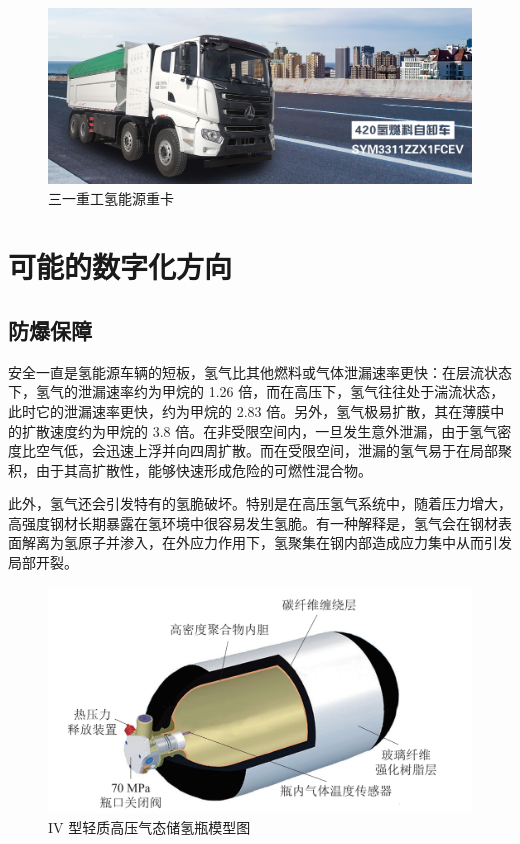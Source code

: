\documentclass[UTF8,a4paper,11pt]{article}
\begin{document}
\begin{figure}[htbp]
\centering
\includegraphics[scale=0.3]{p7.png}
\caption{三一重工氢能源重卡}
\end{figure}

\section{可能的数字化方向}
\subsection{防爆保障}
安全一直是氢能源车辆的短板，氢气比其他燃料或气体泄漏速率更快：在层流状态下，氢气的泄漏速率约为甲烷的 1.26 倍，而在高压下，氢气往往处于湍流状态，此时它的泄漏速率更快，约为甲烷的 2.83 倍。另外，氢气极易扩散，其在薄膜中的扩散速度约为甲烷的 3.8 倍。在非受限空间内，一旦发生意外泄漏，由于氢气密度比空气低，会迅速上浮并向四周扩散。而在受限空间，泄漏的氢气易于在局部聚积，由于其高扩散性，能够快速形成危险的可燃性混合物。

此外，氢气还会引发特有的氢脆破坏。特别是在高压氢气系统中，随着压力增大，高强度钢材长期暴露在氢环境中很容易发生氢脆。有一种解释是，氢气会在钢材表面解离为氢原子并渗入，在外应力作用下，氢聚集在钢内部造成应力集中从而引发局部开裂。

\begin{figure}[htbp]
\centering
\includegraphics[scale=0.45]{p8.png}
\caption{IV 型轻质高压气态储氢瓶模型图}
\end{figure}
\end{document}
